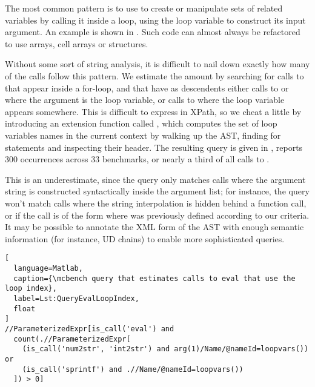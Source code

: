 The most common pattern is to use  to create or manipulate sets of
related variables by calling it inside a loop, using the loop variable to
construct its input argument. An example is shown in .
Such code can almost always be refactored to use arrays, cell arrays or
structures.



Without some sort of string analysis, it is difficult to nail down exactly how
many of the calls follow this pattern. We estimate the amount by searching for
calls to  that appear inside a for-loop, and that have as
descendents either calls to  or  where the argument
is the loop variable, or calls to  where the loop variable
appears somewhere. This is difficult to express in XPath, so we cheat a little
by introducing an extension function called , which computes
the set of loop variables names in the current context by walking up the AST,
finding for statements and inspecting their header. The resulting query is
given in , reports 300 occurrences across 33
benchmarks, or nearly a third of all calls to .

This is an underestimate, since the query only matches calls where the argument
string is constructed syntactically inside the argument list; for instance, the
query won't match calls where the string interpolation is hidden behind a
function call, or if the call is of the form  where  was
previously defined according to our criteria. It may be possible to annotate
the XML form of the AST with enough semantic information (for instance, UD
chains) to enable more sophisticated queries.

\begin{lstlisting}[
  language=Matlab,
  caption={\mcbench query that estimates calls to eval that use the loop index},
  label=Lst:QueryEvalLoopIndex,
  float
]
//ParameterizedExpr[is_call('eval') and
  count(.//ParameterizedExpr[
    (is_call('num2str', 'int2str') and arg(1)/Name/@nameId=loopvars()) or
    (is_call('sprintf') and .//Name/@nameId=loopvars())
  ]) > 0]
\end{lstlisting}

